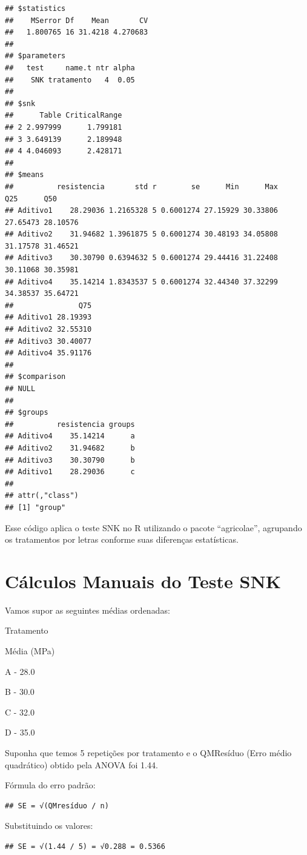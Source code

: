 \documentclass[
]{article}
\begin{document}
\begin{verbatim}
## $statistics
##    MSerror Df    Mean       CV
##   1.800765 16 31.4218 4.270683
## 
## $parameters
##   test     name.t ntr alpha
##    SNK tratamento   4  0.05
## 
## $snk
##      Table CriticalRange
## 2 2.997999      1.799181
## 3 3.649139      2.189948
## 4 4.046093      2.428171
## 
## $means
##          resistencia       std r        se      Min      Max      Q25      Q50
## Aditivo1    28.29036 1.2165328 5 0.6001274 27.15929 30.33806 27.65473 28.10576
## Aditivo2    31.94682 1.3961875 5 0.6001274 30.48193 34.05808 31.17578 31.46521
## Aditivo3    30.30790 0.6394632 5 0.6001274 29.44416 31.22408 30.11068 30.35981
## Aditivo4    35.14214 1.8343537 5 0.6001274 32.44340 37.32299 34.38537 35.64721
##               Q75
## Aditivo1 28.19393
## Aditivo2 32.55310
## Aditivo3 30.40077
## Aditivo4 35.91176
## 
## $comparison
## NULL
## 
## $groups
##          resistencia groups
## Aditivo4    35.14214      a
## Aditivo2    31.94682      b
## Aditivo3    30.30790      b
## Aditivo1    28.29036      c
## 
## attr(,"class")
## [1] "group"
\end{verbatim}

Esse código aplica o teste SNK no R utilizando o pacote ``agricolae'',
agrupando os tratamentos por letras conforme suas diferenças
estatísticas.

\section{Cálculos Manuais do Teste
SNK}\label{cuxe1lculos-manuais-do-teste-snk}

Vamos supor as seguintes médias ordenadas:

Tratamento

Média (MPa)

A - 28.0

B - 30.0

C - 32.0

D - 35.0

Suponha que temos 5 repetições por tratamento e o QMResíduo (Erro médio
quadrático) obtido pela ANOVA foi 1.44.

Fórmula do erro padrão:

\begin{verbatim}
## SE = √(QMresíduo / n)
\end{verbatim}

Substituindo os valores:

\begin{verbatim}
## SE = √(1.44 / 5) = √0.288 = 0.5366
\end{verbatim}
\end{document}
